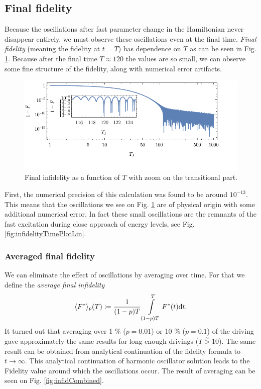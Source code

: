 \subsection{Final fidelity}
Because the oscillations after fast parameter change in the Hamiltonian never disappear entirely, we must observe these oscillations even at the final time. \emph{Final fidelity} (meaning the fidelity at $t=T$) has dependence on $T$ as can be seen in Fig. \ref{fig:infidelityTfPlotLogLinCombined}. Because after the final time $T\approx 120$ the values are so small, we can observe some fine structure of the fidelity, along with numerical error artifacts.
\begin{figure}[H]
    \centering
    \includegraphics[scale=1.2]{../img/infidelityTfPlotLogLinCombined1.pdf}
    \caption{Final infidelity as a function of $T$ with zoom on the transitional part.}
    \label{fig:infidelityTfPlotLogLinCombined}
\end{figure}

First, the numerical precision of this calculation was found to be around $10^{-13}$. This means that the oscillations we see on Fig. \ref{fig:infidelityTfPlotLogLinCombined} are of physical origin with some additional numerical error. In fact these small oscillations are the remnants of the fast excitation during close approach of energy levels, see Fig. \ref{fig:infidelityTimePlotLin}. 



\subsubsection{Averaged final fidelity}
We can eliminate the effect of oscillations by averaging over time. For that we define the \emph{average final infidelity}
\begin{equation}
    \langle F^*\rangle_p(T) \coloneqq \frac{1}{(1-p) T}\int\limits_{(1-p) T}^{T} F^*(t)\mathrm{d} t.
\end{equation}
It turned out that averaging over 1 \% ($p=0.01$) or 10 \% ($p=0.1$) of the driving gave approximately the same results for long enough drivings ($T\overset{\sim}{>} 10$). The same result can be obtained from analytical continuation of the fidelity formula to $t\rightarrow  \infty$. This analytical continuation of harmonic oscillator solution leads to the Fidelity value around which the oscillations occur. The result of averaging can be seen on Fig. \ref{fig:infidCombined}.

